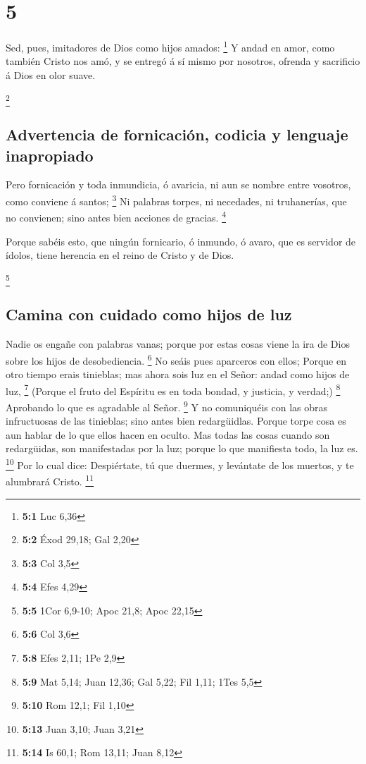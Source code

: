 \hypertarget{section-4}{%
\section{5}\label{section-4}}

 Sed, pues, imitadores de Dios como hijos amados:
\footnote{\textbf{5:1} Luc 6,36}  Y andad en amor, como
también Cristo nos amó, y se entregó á sí mismo por nosotros, ofrenda y
sacrificio á Dios en olor suave.

\footnote{\textbf{5:2} Éxod 29,18; Gal 2,20}

\hypertarget{advertencia-de-fornicaciuxf3n-codicia-y-lenguaje-inapropiado}{%
\subsection{Advertencia de fornicación, codicia y lenguaje
inapropiado}\label{advertencia-de-fornicaciuxf3n-codicia-y-lenguaje-inapropiado}}

 Pero fornicación y toda inmundicia, ó avaricia, ni aun se
nombre entre vosotros, como conviene á santos; \footnote{\textbf{5:3}
  Col 3,5}  Ni palabras torpes, ni necedades, ni
truhanerías, que no convienen; sino antes bien acciones de gracias.
\footnote{\textbf{5:4} Efes 4,29}

 Porque sabéis esto, que ningún fornicario, ó inmundo, ó
avaro, que es servidor de ídolos, tiene herencia en el reino de Cristo y
de Dios.

\footnote{\textbf{5:5} 1Cor 6,9-10; Apoc 21,8; Apoc 22,15}

\hypertarget{camina-con-cuidado-como-hijos-de-luz}{%
\subsection{Camina con cuidado como hijos de
luz}\label{camina-con-cuidado-como-hijos-de-luz}}

 Nadie os engañe con palabras vanas; porque por estas
cosas viene la ira de Dios sobre los hijos de desobediencia. \footnote{\textbf{5:6}
  Col 3,6}  No seáis pues aparceros con ellos;
 Porque en otro tiempo erais tinieblas; mas ahora sois luz
en el Señor: andad como hijos de luz, \footnote{\textbf{5:8} Efes 2,11;
  1Pe 2,9}  (Porque el fruto del Espíritu es en toda
bondad, y justicia, y verdad;) \footnote{\textbf{5:9} Mat 5,14; Juan
  12,36; Gal 5,22; Fil 1,11; 1Tes 5,5}  Aprobando lo que
es agradable al Señor. \footnote{\textbf{5:10} Rom 12,1; Fil 1,10}
 Y no comuniquéis con las obras infructuosas de las
tinieblas; sino antes bien redargüidlas.  Porque torpe
cosa es aun hablar de lo que ellos hacen en oculto.  Mas
todas las cosas cuando son redargüidas, son manifestadas por la luz;
porque lo que manifiesta todo, la luz es. \footnote{\textbf{5:13} Juan
  3,10; Juan 3,21}  Por lo cual dice: Despiértate, tú que
duermes, y levántate de los muertos, y te alumbrará Cristo. \footnote{\textbf{5:14}
  Is 60,1; Rom 13,11; Juan 8,12}

